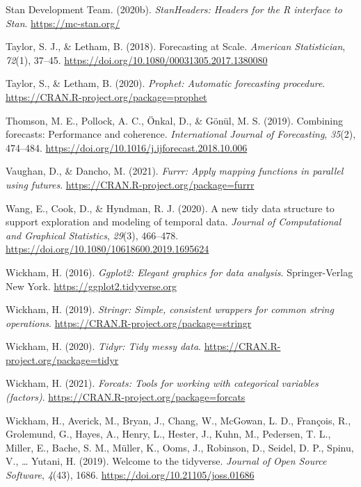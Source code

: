\documentclass[
  english,
  man,floatsintext]{apa7}
\begin{document}
\leavevmode\hypertarget{ref-R-StanHeaders}{}%
Stan Development Team. (2020b). \emph{StanHeaders: Headers for the R interface to Stan}. \url{https://mc-stan.org/}

\leavevmode\hypertarget{ref-Taylor2018}{}%
Taylor, S. J., \& Letham, B. (2018). Forecasting at Scale. \emph{American Statistician}, \emph{72}(1), 37--45. \url{https://doi.org/10.1080/00031305.2017.1380080}

\leavevmode\hypertarget{ref-R-prophet}{}%
Taylor, S., \& Letham, B. (2020). \emph{Prophet: Automatic forecasting procedure}. \url{https://CRAN.R-project.org/package=prophet}

\leavevmode\hypertarget{ref-Thomson2019}{}%
Thomson, M. E., Pollock, A. C., Önkal, D., \& Gönül, M. S. (2019). Combining forecasts: Performance and coherence. \emph{International Journal of Forecasting}, \emph{35}(2), 474--484. \url{https://doi.org/10.1016/j.ijforecast.2018.10.006}

\leavevmode\hypertarget{ref-R-furrr}{}%
Vaughan, D., \& Dancho, M. (2021). \emph{Furrr: Apply mapping functions in parallel using futures}. \url{https://CRAN.R-project.org/package=furrr}

\leavevmode\hypertarget{ref-R-tsibble}{}%
Wang, E., Cook, D., \& Hyndman, R. J. (2020). A new tidy data structure to support exploration and modeling of temporal data. \emph{Journal of Computational and Graphical Statistics}, \emph{29}(3), 466--478. \url{https://doi.org/10.1080/10618600.2019.1695624}

\leavevmode\hypertarget{ref-R-ggplot2}{}%
Wickham, H. (2016). \emph{Ggplot2: Elegant graphics for data analysis}. Springer-Verlag New York. \url{https://ggplot2.tidyverse.org}

\leavevmode\hypertarget{ref-R-stringr}{}%
Wickham, H. (2019). \emph{Stringr: Simple, consistent wrappers for common string operations}. \url{https://CRAN.R-project.org/package=stringr}

\leavevmode\hypertarget{ref-R-tidyr}{}%
Wickham, H. (2020). \emph{Tidyr: Tidy messy data}. \url{https://CRAN.R-project.org/package=tidyr}

\leavevmode\hypertarget{ref-R-forcats}{}%
Wickham, H. (2021). \emph{Forcats: Tools for working with categorical variables (factors)}. \url{https://CRAN.R-project.org/package=forcats}

\leavevmode\hypertarget{ref-R-tidyverse}{}%
Wickham, H., Averick, M., Bryan, J., Chang, W., McGowan, L. D., François, R., Grolemund, G., Hayes, A., Henry, L., Hester, J., Kuhn, M., Pedersen, T. L., Miller, E., Bache, S. M., Müller, K., Ooms, J., Robinson, D., Seidel, D. P., Spinu, V., \ldots{} Yutani, H. (2019). Welcome to the tidyverse. \emph{Journal of Open Source Software}, \emph{4}(43), 1686. \url{https://doi.org/10.21105/joss.01686}
\end{document}
